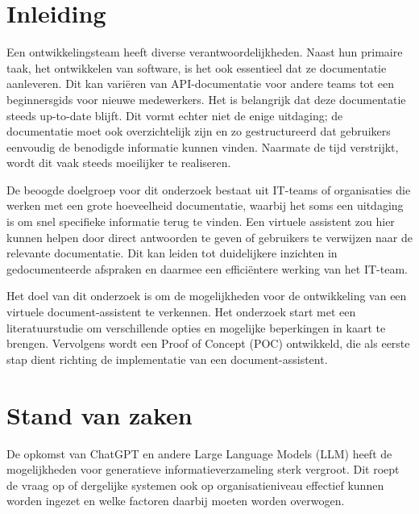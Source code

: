
\section{Inleiding}%
\label{sec:inleiding}

Een ontwikkelingsteam heeft diverse verantwoordelijkheden. Naast hun primaire taak, het ontwikkelen van software, is het ook essentieel dat ze documentatie aanleveren. Dit kan variëren van API-documentatie voor andere teams tot een beginnersgids voor nieuwe medewerkers. Het is belangrijk dat deze documentatie steeds up-to-date blijft. Dit vormt echter niet de enige uitdaging; de documentatie moet ook overzichtelijk zijn en zo gestructureerd dat gebruikers eenvoudig de benodigde informatie kunnen vinden. Naarmate de tijd verstrijkt, wordt dit vaak steeds moeilijker te realiseren.

De beoogde doelgroep voor dit onderzoek bestaat uit IT-teams of organisaties die werken met een grote hoeveelheid documentatie, waarbij het soms een uitdaging is om snel specifieke informatie terug te vinden. Een virtuele assistent zou hier kunnen helpen door direct antwoorden te geven of gebruikers te verwijzen naar de relevante documentatie. Dit kan leiden tot duidelijkere inzichten in gedocumenteerde afspraken en daarmee een efficiëntere werking van het IT-team.

Het doel van dit onderzoek is om de mogelijkheden voor de ontwikkeling van een virtuele document-assistent te verkennen. Het onderzoek start met een literatuurstudie om verschillende opties en mogelijke beperkingen in kaart te brengen. Vervolgens wordt een Proof of Concept (POC) ontwikkeld, die als eerste stap dient richting de implementatie van een document-assistent.


\section{Stand van zaken}%
\label{sec:stand van zaken}

De opkomst van ChatGPT en andere Large Language Models (LLM) heeft de mogelijkheden voor generatieve informatieverzameling sterk vergroot. Dit roept de vraag op of dergelijke systemen ook op organisatieniveau effectief kunnen worden ingezet en welke factoren daarbij moeten worden overwogen.

